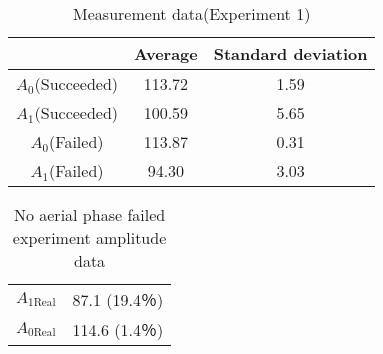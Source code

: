               \begin{table}[bh]
                \begin{center}
                  \caption{Measurement data(Experiment 1)}
                  \vspace{2mm}
                  \begin{tabular}{c|cc}
                    \hline
                     & Average & Standard deviation\\
                    \hline
                    $A_0$(Succeeded)& 113.72& 1.59\\
                    $A_1$(Succeeded)& 100.59& 5.65\\
                    $A_0$(Failed)& 113.87& 0.31\\
                    $A_1$(Failed)& 94.30& 3.03\\                      
                    \hline
                  \end{tabular}
                \end{center}
              \end{table}
        \newpage
        \clearpage
        \begin{table}[t]
                \begin{center}
                  \caption{No aerial phase failed experiment amplitude data}
                  \vspace{2mm}
                  \begin{tabular}{c|c}
                    \hline
                    $A_{\mathrm{1Real}}$ & 87.1 (19.4％)\\
                    $A_{\mathrm{0Real}}$ & 114.6 (1.4％)\\                      
                    \hline
                  \end{tabular}
                \end{center}
              \end{table}
        
              